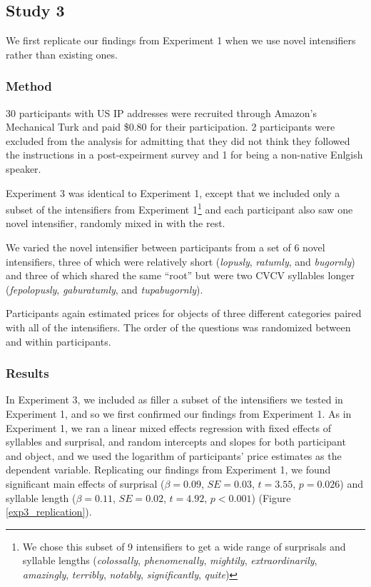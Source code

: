 \documentclass[10pt,letterpaper]{article}
\newcommand{\w}[1]{\emph{#1}}
\begin{document}
\subsection{Study 3 \label{sec:study3}}


We first replicate our findings from Experiment 1 when we use novel intensifiers rather than existing ones.

\subsubsection{Method}
30 participants with US IP addresses were recruited through Amazon's Mechanical Turk and paid \$0.80 for their participation. 2 participants were excluded from the analysis for admitting that they did not think they followed the instructions in a post-expeirment survey and 1 for being a non-native Enlgish speaker.

Experiment 3 was identical to Experiment 1, except that we included only a subset of the intensifiers from Experiment 1\footnote{
  We chose this subset of 9 intensifiers to get a wide range of surprisals and syllable lengths (\w{colossally}, \w{phenomenally}, \w{mightily}, \w{extraordinarily}, \w{amazingly}, \w{terribly}, \w{notably}, \w{significantly}, \w{quite})
}
and each participant also saw one novel intensifier, randomly mixed in with the rest.

We varied the novel intensifier between participants from a set of 6 novel intensifiers, three of which were relatively short (\w{lopusly}, \w{ratumly}, and \w{bugornly}) and three of which shared the same ``root'' but were two CVCV syllables longer (\w{fepolopusly}, \w{gaburatumly}, and \w{tupabugornly}).

Participants again estimated prices for objects of three different categories paired with all of the intensifiers. The order of the questions was randomized between and within participants.

\subsubsection{Results}
In Experiment 3, we included as filler a subset of the intensifiers we tested in Experiment 1, and so we first confirmed our findings from Experiment 1. As in Experiment 1, we ran a linear mixed effects regression with fixed effects of syllables and surprisal, and random intercepts and slopes for both participant and object, and we used the logarithm of participants' price estimates as the dependent variable. Replicating our findings from Experiment 1, we found significant main effects of surprisal ($\beta=0.09$, $SE=0.03$, $t=3.55$, $p=0.026$) and syllable length ($\beta=0.11$, $SE=0.02$, $t=4.92$, $p<0.001$) (Figure \ref{exp3_replication}).
\end{document}
